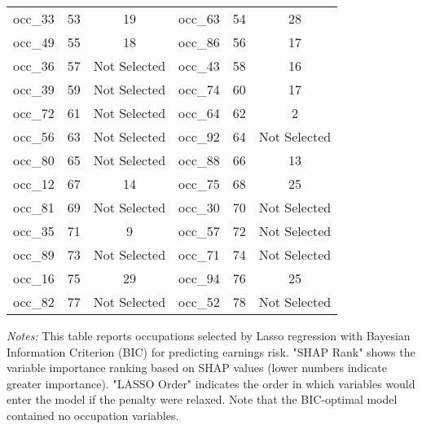 \documentclass[12pt]{article}
\begin{document}
\begin{table}[H]
\begin{tabular}{lcc|lcc}
occ\_33 & 53 & 19 & occ\_63 & 54 & 28 \\
occ\_49 & 55 & 18 & occ\_86 & 56 & 17 \\
occ\_36 & 57 & Not Selected & occ\_43 & 58 & 16 \\
occ\_39 & 59 & Not Selected & occ\_74 & 60 & 17 \\
occ\_72 & 61 & Not Selected & occ\_64 & 62 & 2 \\
occ\_56 & 63 & Not Selected & occ\_92 & 64 & Not Selected \\
occ\_80 & 65 & Not Selected & occ\_88 & 66 & 13 \\
occ\_12 & 67 & 14 & occ\_75 & 68 & 25 \\
occ\_81 & 69 & Not Selected & occ\_30 & 70 & Not Selected \\
occ\_35 & 71 & 9 & occ\_57 & 72 & Not Selected \\
occ\_89 & 73 & Not Selected & occ\_71 & 74 & Not Selected \\
occ\_16 & 75 & 29 & occ\_94 & 76 & 25 \\
occ\_82 & 77 & Not Selected & occ\_52 & 78 & Not Selected \\
\bottomrule
\end{tabular}%
\newline

\footnotesize
\textit{Notes:} This table reports occupations selected by Lasso regression with Bayesian Information Criterion (BIC) for predicting earnings risk. "SHAP Rank" shows the variable importance ranking based on SHAP values (lower numbers indicate greater importance). "LASSO Order" indicates the order in which variables would enter the model if the penalty were relaxed. Note that the BIC-optimal model contained no occupation variables.

\end{table}
\end{document}
